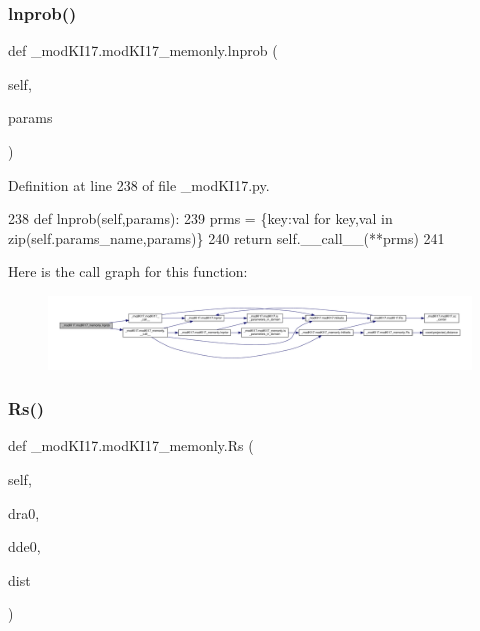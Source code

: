 \subsubsection{\texorpdfstring{lnprob()}{lnprob()}}
{\footnotesize\ttfamily def \+\_\+mod\+K\+I17.\+mod\+K\+I17\+\_\+memonly.\+lnprob (\begin{DoxyParamCaption}\item[{}]{self,  }\item[{}]{params }\end{DoxyParamCaption})}



Definition at line 238 of file \+\_\+mod\+K\+I17.\+py.


\begin{DoxyCode}
238     \textcolor{keyword}{def }lnprob(self,params):
239         prms = \{key:val \textcolor{keywordflow}{for} key,val \textcolor{keywordflow}{in} zip(self.params\_name,params)\}
240         \textcolor{keywordflow}{return} self.\_\_call\_\_(**prms)
241     
\end{DoxyCode}
Here is the call graph for this function\+:\nopagebreak
\begin{figure}[H]
\begin{center}
\leavevmode
\includegraphics[width=350pt]{d9/d8f/class__modKI17_1_1modKI17__memonly_a76cb36f7f23a5dd7f537f9769bd75a4e_cgraph}
\end{center}
\end{figure}
\mbox{\label{class__modKI17_1_1modKI17__memonly_a335fdfaf1863a33e9d52cfc5d299b6dc}} 
\subsubsection{\texorpdfstring{Rs()}{Rs()}}
{\footnotesize\ttfamily def \+\_\+mod\+K\+I17.\+mod\+K\+I17\+\_\+memonly.\+Rs (\begin{DoxyParamCaption}\item[{}]{self,  }\item[{}]{dra0,  }\item[{}]{dde0,  }\item[{}]{dist }\end{DoxyParamCaption})}



